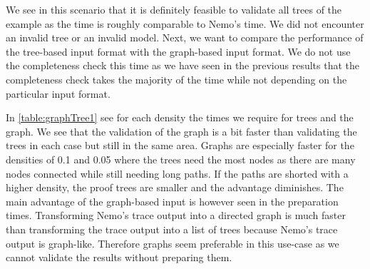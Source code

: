 We see in this scenario that it is definitely feasible to validate all trees of the example as the time is roughly comparable to Nemo's time. We did not encounter an invalid tree or an invalid model. Next, we want to compare the performance of the tree-based input format with the graph-based input format. We do not use the completeness check this time as we have seen in the previous results that the completeness check takes the majority of the time while not depending on the particular input format.

In \cref{table:graphTree1} see for each density the times we require for trees and the graph. We see that the validation of the graph is a bit faster than validating the trees in each case but still in the same area. Graphs are especially faster for the densities of 0.1 and 0.05 where the trees need the most nodes as there are many nodes connected while still needing long paths. If the paths are shorted with a higher density, the proof trees are smaller and the advantage diminishes. The main advantage of the graph-based input is however seen in the preparation times. Transforming Nemo's trace output into a directed graph is much faster than transforming the trace output into a list of trees because Nemo's trace output is graph-like. Therefore graphs seem preferable in this use-case as we cannot validate the results without preparing them.

